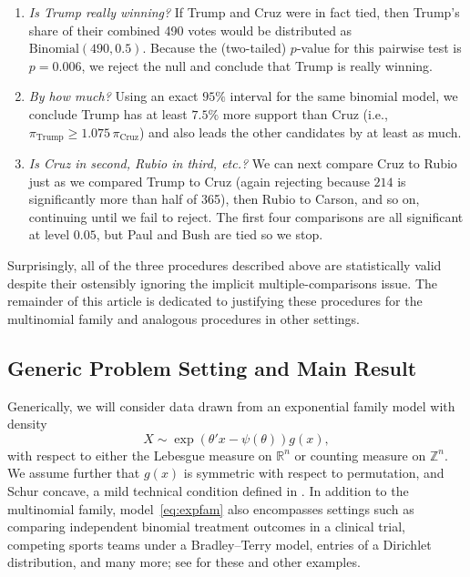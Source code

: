 \documentclass[11pt]{article}
\theoremstyle{definition}
\theoremstyle{custom}
\newcommand{\RR}{\mathbb{R}}
\newcommand{\ZZ}{\mathbb{Z}}
\begin{document}
\begin{enumerate}
\item {\em Is Trump really winning?} If Trump and Cruz were in fact tied, then Trump's share of their combined 490 votes would be distributed as $\text{Binomial}\left(490, 0.5\right)$. Because the (two-tailed) $p$-value for this pairwise test is $p = 0.006$, we reject the null and conclude that Trump is really winning.

\item {\em By how much?} Using an exact $95\%$ interval for the same binomial model, we conclude Trump has at least $7.5\%$ more support than Cruz (i.e., $\pi_{\text{Trump}} \ge 1.075 \,\pi_{\text{Cruz}}$) and also leads the other candidates by at least as much.

\item {\em Is Cruz in second, Rubio in third, etc.?} We can next compare Cruz to Rubio just as we compared Trump to Cruz (again rejecting because $214$ is significantly more than half of 365), then Rubio to Carson, and so on, continuing until we fail to reject. The first four comparisons are all significant at level $0.05$, but Paul and Bush are tied so we stop.
\end{enumerate}

Surprisingly, all of the three procedures described above are statistically valid despite their ostensibly ignoring the implicit multiple-comparisons issue. The remainder of this article is dedicated to justifying these procedures for the multinomial family and analogous procedures in other settings.

\subsection{Generic Problem Setting and Main Result}
\label{sec:probset}

Generically, we will consider data drawn from an exponential family model with density
\begin{equation}
X \sim \exp\left(\theta'x - \psi\left(\theta\right)\right) g\left(x\right),
\label{eq:expfam}
\end{equation}
with respect to either the Lebesgue measure on $\RR^n$ or counting measure on $\ZZ^n$. We assume further that $g\left(x\right)$ is symmetric with respect to permutation, and Schur concave, a mild technical condition defined in . In addition to the multinomial family, model~\eqref{eq:expfam} also encompasses settings such as comparing independent binomial treatment outcomes in a clinical trial, competing sports teams under a Bradley--Terry model, entries of a Dirichlet distribution, and many more; see  for these and other examples.
\end{document}
